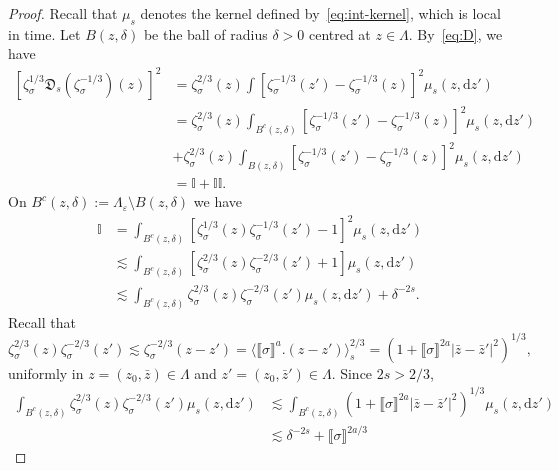 \documentclass{article}
\numberwithin{equation}{section}
\newcommand{\assign}{:=}
\newcommand{\mathd}{\mathrm{d}}
\theoremstyle{plain}
\theoremstyle{definition}
\begin{document}
\begin{proof}
  Recall that $\mu_s$ denotes the kernel defined by~\eqref{eq:int-kernel},
  which is local in time. Let $B (z, \delta)$ be the ball of radius $\delta > 0$
  centred at $z \in \Lambda$. By~\eqref{eq:D}, we have
  \[ \begin{aligned}
       {}[\zeta_{\sigma}^{1 / 3} \mathfrak{D}_s
       (\zeta_{\sigma}^{- 1 / 3}) (z)]^2 & =  \zeta_{\sigma}^{2 / 3} (z) \int
       [\zeta_{\sigma}^{- 1 / 3} (z') - \zeta_{\sigma}^{- 1 / 3} (z)]^2 \mu_s
       (z, \mathd z')\\
       & =  \zeta_{\sigma}^{2 / 3} (z) \int_{B^c (z,
       \delta)} [\zeta_{\sigma}^{- 1 / 3} (z') - \zeta_{\sigma}^{- 1 / 3}
       (z)]^2 \mu_s (z, \mathd z')\\
       &   + \zeta_{\sigma}^{2 / 3} (z) \int_{B (z,
       \delta)} [\zeta_{\sigma}^{- 1 / 3} (z') - \zeta_{\sigma}^{- 1 / 3}
       (z)]^2 \mu_s (z, \mathd z')\\
       & =  \mathbb{I}+\mathbb{I}\mathbb{I}.
     \end{aligned} \]
  On $B^c (z, \delta) \assign \Lambda_{\varepsilon} \setminus B (z, \delta)$
  we have
  \begin{align*}
       \mathbb{I}
       &= \int_{B^c (z, \delta)}
       [\zeta_{\sigma}^{1 / 3} (z)
       \zeta_{\sigma}^{- 1 / 3} (z') - 1]^2 \mu_s (z, \mathd z')\\
       &\lesssim
       \int_{B^c (z, \delta)} [\zeta_{\sigma}^{2 / 3} (z)
       \zeta_{\sigma}^{- 2 / 3} (z') + 1] \mu_s (z, \mathd z')\\
       &\lesssim \int_{B^c (z, \delta)} \zeta_{\sigma}^{2 / 3} (z)
       \zeta_{\sigma}^{- 2 / 3} (z') \mu_s (z, \mathd z') + \delta^{- 2 s} .
  \end{align*}
  Recall that
  \[ \zeta_{\sigma}^{2 / 3} (z) \zeta_{\sigma}^{- 2 / 3} (z') \lesssim
     \zeta^{- 2 / 3}_{\sigma} (z - z') = \langle \llbracket
     \sigma \rrbracket^a . (z - z') \rangle_s^{2 / 3} = (1 + \llbracket \sigma
     \rrbracket^{2 a} | \bar{z} - \bar{z}' |^2)^{1 / 3}, \]
  uniformly in $z = (z_0, \bar{z}) \in \Lambda$ and $z' = (z_0, \bar{z}') \in
  \Lambda$. Since $2 s > 2 / 3$,
  \begin{align*}
    \int_{B^c (z, \delta)} \zeta_{\sigma}^{2 / 3} (z) \zeta_{\sigma}^{- 2 / 3}
    (z') \mu_s (z, \mathd z') &\lesssim  \int_{B^c (z, \delta)} (1 +
    \llbracket \sigma \rrbracket^{2 a} | \bar{z} - \bar{z}' |^2)^{1 / 3} \mu_s
    (z, \mathd z')\\
 &\lesssim  \delta^{- 2 s} + \llbracket \sigma \rrbracket^{2 a / 3}

\end{align*}
\end{proof}
\end{document}
